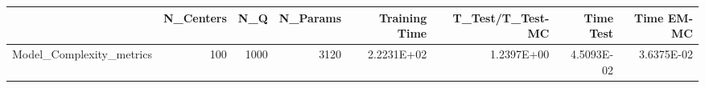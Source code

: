 \begin{tabular}{lrrrrrrr}
\toprule
{} &  N\_Centers &   N\_Q &  N\_Params &  Training Time &  T\_Test/T\_Test-MC &  Time Test &  Time EM-MC \\
\midrule
Model\_Complexity\_metrics &        100 &  1000 &      3120 &     2.2231E+02 &        1.2397E+00 & 4.5093E-02 &  3.6375E-02 \\
\bottomrule
\end{tabular}
